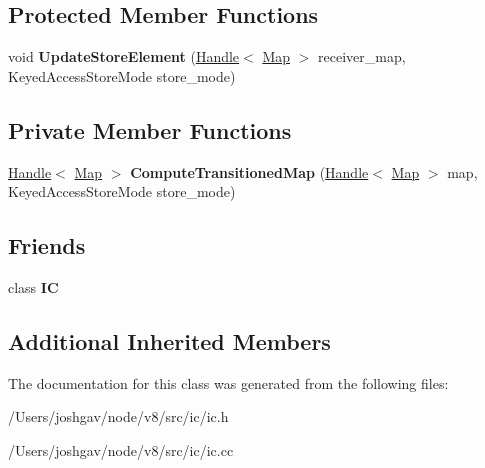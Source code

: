 \subsection*{Protected Member Functions}
\begin{DoxyCompactItemize}
\item 
void {\bfseries Update\+Store\+Element} (\hyperlink{classv8_1_1internal_1_1_handle}{Handle}$<$ \hyperlink{classv8_1_1internal_1_1_map}{Map} $>$ receiver\+\_\+map, Keyed\+Access\+Store\+Mode store\+\_\+mode)\hypertarget{classv8_1_1internal_1_1_keyed_store_i_c_ab216233532324e889e32b82339b28ba6}{}\label{classv8_1_1internal_1_1_keyed_store_i_c_ab216233532324e889e32b82339b28ba6}

\end{DoxyCompactItemize}
\subsection*{Private Member Functions}
\begin{DoxyCompactItemize}
\item 
\hyperlink{classv8_1_1internal_1_1_handle}{Handle}$<$ \hyperlink{classv8_1_1internal_1_1_map}{Map} $>$ {\bfseries Compute\+Transitioned\+Map} (\hyperlink{classv8_1_1internal_1_1_handle}{Handle}$<$ \hyperlink{classv8_1_1internal_1_1_map}{Map} $>$ map, Keyed\+Access\+Store\+Mode store\+\_\+mode)\hypertarget{classv8_1_1internal_1_1_keyed_store_i_c_a58dba767985c698f06c6545c2f802280}{}\label{classv8_1_1internal_1_1_keyed_store_i_c_a58dba767985c698f06c6545c2f802280}

\end{DoxyCompactItemize}
\subsection*{Friends}
\begin{DoxyCompactItemize}
\item 
class {\bfseries IC}\hypertarget{classv8_1_1internal_1_1_keyed_store_i_c_ae59e849648858af1fd22081890d47b78}{}\label{classv8_1_1internal_1_1_keyed_store_i_c_ae59e849648858af1fd22081890d47b78}

\end{DoxyCompactItemize}
\subsection*{Additional Inherited Members}


The documentation for this class was generated from the following files\+:\begin{DoxyCompactItemize}
\item 
/\+Users/joshgav/node/v8/src/ic/ic.\+h\item 
/\+Users/joshgav/node/v8/src/ic/ic.\+cc\end{DoxyCompactItemize}
